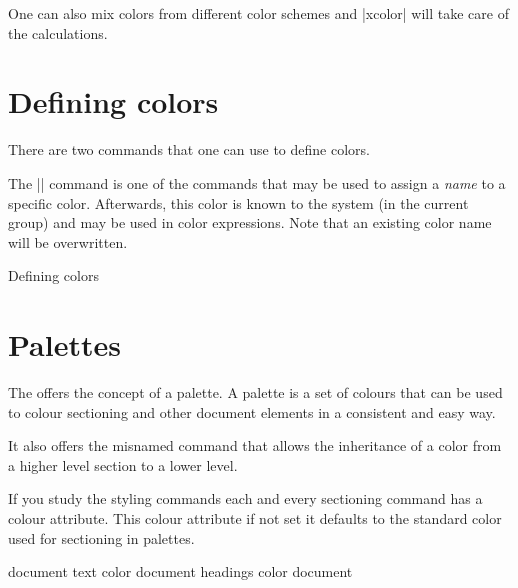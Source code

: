 One can also mix colors from different color schemes and |xcolor| will take care of the calculations.

\section{Defining colors}

There are two commands that one can use to define colors.

\begin{macro}{\definecolor} 
The |\definecolor| command is one of the commands that may be used to assign a \textit{name} to a specific color. Afterwards, this color is known to the system (in the current group) and may be used in color expressions. Note that an existing color name will be overwritten.
\end{macro} 

\begin{texexample}{Defining colors}{}

\color{myblack}\lorem
\end{texexample}

\section{Palettes}

The  offers the concept of a palette. A palette is a set of colours that can be used to colour sectioning and other document elements in a consistent and easy way.

It also offers the misnamed command \cmd{\inherit} that allows the inheritance of a color from a higher level section to a lower level.

If you study the styling commands each and every sectioning command has a colour attribute. This colour attribute if not set it defaults to the standard color used for sectioning in palettes.


document text color
document headings color
document 











